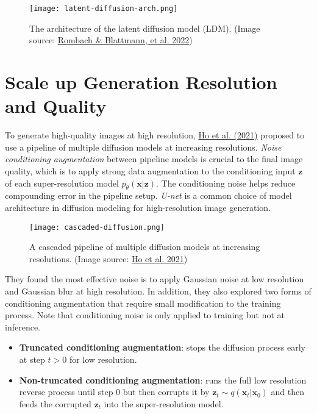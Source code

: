 \documentclass[12pt]{article}
\begin{document}
\begin{figure}[H]
    \centering
    \texttt{[image: latent-diffusion-arch.png]}
    \caption{The architecture of the latent diffusion model (LDM). (Image source: \href{https://arxiv.org/abs/2112.10752}{Rombach \& Blattmann, et al. 2022})}
\end{figure}

\section{Scale up Generation Resolution and Quality}
\label{scale-up-generation-resolution-and-quality}
To generate high-quality images at high resolution, \href{https://arxiv.org/abs/2106.15282}{Ho et al. (2021)} proposed to use a pipeline of multiple diffusion models at increasing resolutions. \emph{Noise conditioning augmentation} between pipeline models is crucial to the final image quality, which is to apply strong data augmentation to the conditioning input $\mathbf{z}$ of each super-resolution model $p_\theta(\mathbf{x} \vert \mathbf{z})$. The conditioning noise helps reduce compounding error in the pipeline setup. \emph{U-net} is a common choice of model architecture in diffusion modeling for high-resolution image generation.

\begin{figure}[H]
    \centering
    \texttt{[image: cascaded-diffusion.png]}
    \caption{A cascaded pipeline of multiple diffusion models at increasing resolutions. (Image source: \href{https://arxiv.org/abs/2106.15282}{Ho et al. 2021})}
\end{figure}

They found the most effective noise is to apply Gaussian noise at low resolution and Gaussian blur at high resolution. In addition, they also explored two forms of conditioning augmentation that require small modification to the training process. Note that conditioning noise is only applied to training but not at inference.
\begin{itemize}
    \item \textbf{Truncated conditioning augmentation}: stops the diffusion process early at step $t > 0$ for low resolution.
    \item \textbf{Non-truncated conditioning augmentation}: runs the full low resolution reverse process until step 0 but then corrupts it by $\mathbf{z}_t \sim q(\mathbf{x}_t \vert \mathbf{x}_0)$ and then feeds the corrupted $\mathbf{z}_t$ into the super-resolution model.
\end{itemize}
\end{document}
